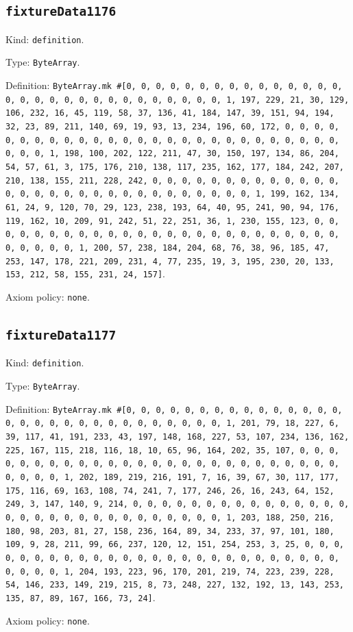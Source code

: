 \documentclass[11pt]{article}
\begin{document}
\subsection*{\texttt{fixtureData1176}}
\noindent Kind: \texttt{definition}.\par
\noindent Type: \texttt{ByteArray}.\par
\noindent Definition: \texttt{ByteArray.mk \#[0, 0, 0, 0, 0, 0, 0, 0, 0, 0, 0, 0, 0, 0, 0, 0, 0, 0, 0, 0, 0, 0, 0, 0, 0, 0, 0, 0, 0, 0, 1, 197, 229, 21, 30, 129, 106, 232, 16, 45, 119, 58, 37, 136, 41, 184, 147, 39, 151, 94, 194, 32, 23, 89, 211, 140, 69, 19, 93, 13, 234, 196, 60, 172, 0, 0, 0, 0, 0, 0, 0, 0, 0, 0, 0, 0, 0, 0, 0, 0, 0, 0, 0, 0, 0, 0, 0, 0, 0, 0, 0, 0, 0, 0, 1, 198, 100, 202, 122, 211, 47, 30, 150, 197, 134, 86, 204, 54, 57, 61, 3, 175, 176, 210, 138, 117, 235, 162, 177, 184, 242, 207, 210, 138, 155, 211, 228, 242, 0, 0, 0, 0, 0, 0, 0, 0, 0, 0, 0, 0, 0, 0, 0, 0, 0, 0, 0, 0, 0, 0, 0, 0, 0, 0, 0, 0, 0, 0, 1, 199, 162, 134, 61, 24, 9, 120, 70, 29, 123, 238, 193, 64, 40, 95, 241, 90, 94, 176, 119, 162, 10, 209, 91, 242, 51, 22, 251, 36, 1, 230, 155, 123, 0, 0, 0, 0, 0, 0, 0, 0, 0, 0, 0, 0, 0, 0, 0, 0, 0, 0, 0, 0, 0, 0, 0, 0, 0, 0, 0, 0, 0, 0, 1, 200, 57, 238, 184, 204, 68, 76, 38, 96, 185, 47, 253, 147, 178, 221, 209, 231, 4, 77, 235, 19, 3, 195, 230, 20, 133, 153, 212, 58, 155, 231, 24, 157]}.\par
\noindent Axiom policy: \texttt{none}.\par
\subsection*{\texttt{fixtureData1177}}
\noindent Kind: \texttt{definition}.\par
\noindent Type: \texttt{ByteArray}.\par
\noindent Definition: \texttt{ByteArray.mk \#[0, 0, 0, 0, 0, 0, 0, 0, 0, 0, 0, 0, 0, 0, 0, 0, 0, 0, 0, 0, 0, 0, 0, 0, 0, 0, 0, 0, 0, 0, 1, 201, 79, 18, 227, 6, 39, 117, 41, 191, 233, 43, 197, 148, 168, 227, 53, 107, 234, 136, 162, 225, 167, 115, 218, 116, 18, 10, 65, 96, 164, 202, 35, 107, 0, 0, 0, 0, 0, 0, 0, 0, 0, 0, 0, 0, 0, 0, 0, 0, 0, 0, 0, 0, 0, 0, 0, 0, 0, 0, 0, 0, 0, 0, 1, 202, 189, 219, 216, 191, 7, 16, 39, 67, 30, 117, 177, 175, 116, 69, 163, 108, 74, 241, 7, 177, 246, 26, 16, 243, 64, 152, 249, 3, 147, 140, 9, 214, 0, 0, 0, 0, 0, 0, 0, 0, 0, 0, 0, 0, 0, 0, 0, 0, 0, 0, 0, 0, 0, 0, 0, 0, 0, 0, 0, 0, 0, 0, 1, 203, 188, 250, 216, 180, 98, 203, 81, 27, 158, 236, 164, 89, 34, 233, 37, 97, 101, 180, 109, 9, 28, 211, 99, 66, 237, 120, 12, 151, 254, 253, 3, 25, 0, 0, 0, 0, 0, 0, 0, 0, 0, 0, 0, 0, 0, 0, 0, 0, 0, 0, 0, 0, 0, 0, 0, 0, 0, 0, 0, 0, 0, 0, 1, 204, 193, 223, 96, 170, 201, 219, 74, 223, 239, 228, 54, 146, 233, 149, 219, 215, 8, 73, 248, 227, 132, 192, 13, 143, 253, 135, 87, 89, 167, 166, 73, 24]}.\par
\noindent Axiom policy: \texttt{none}.\par
\end{document}
